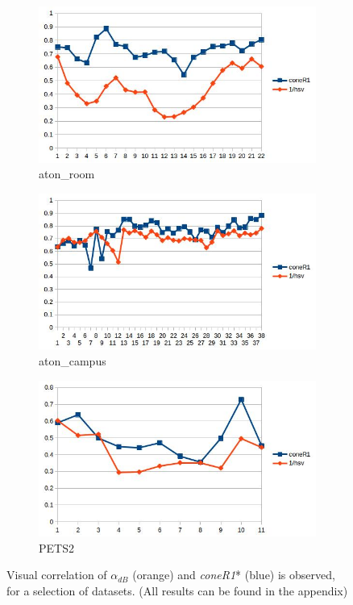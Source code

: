 \documentclass[12pt]{report}
\begin{document}
\begin{figure}
  \centering
  \begin{subfigure}{1\linewidth}
  \includegraphics[width=1\linewidth]{figures/correlations/db/room_hsv.jpg}
  \caption{aton\_room}
\end{subfigure}
\hfill
\begin{subfigure}{.49\linewidth}
  \includegraphics[width=1\linewidth]{figures/correlations/db/campus_hsv.jpg}
  \caption{aton\_campus}
\end{subfigure}
\begin{subfigure}{.49\linewidth}
  \includegraphics[width=1\linewidth]{figures/correlations/db/pets2_hsv.jpg}
  \caption{PETS2}
\end{subfigure}

\caption{Visual correlation of $\alpha_{dB}$ (orange) and \textit{coneR1}* (blue) is observed, for a selection of datasets. (All results can be found in the appendix)}
\label{fig:corr_db}
\end{figure}
\end{document}
